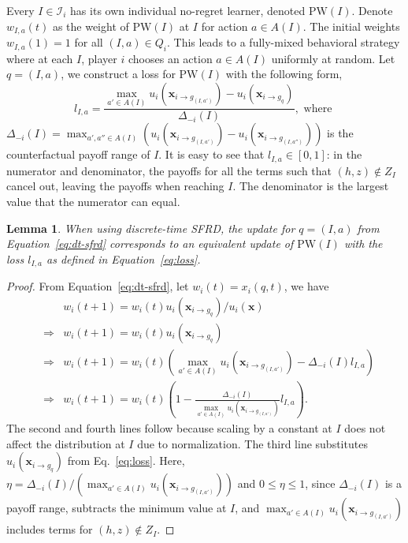 \documentclass{aamas2014}
\newcommand{\bx}{\mathbf{x}}
\newcommand{\cI}{\mathcal{I}}
\newcommand{\PW}{\mbox{PW}}
\newtheorem{lemma}{Lemma}
\begin{document}
Every $I \in \cI_i$ has its own individual no-regret learner, denoted $\PW(I)$. 
Denote $w_{I,a}(t)$ as the weight of $\PW(I)$ at $I$ for action $a \in A(I)$. 
The initial weights $w_{I,a}(1) = 1$ for all $(I,a) \in Q_i$. 
This leads to a fully-mixed behavioral strategy where at each $I$, player $i$ chooses an action 
$a \in A(I)$ uniformly at random.
Let $q = (I,a)$, we construct a loss for $\PW(I)$ with the following form,
\begin{equation}
\label{eq:loss}
l_{I,a} = \frac{\max_{a' \in A(I)} u_i(\bx_{i \rightarrow g_{(I,a')}}) - u_i(\bx_{i \rightarrow g_q})}{\Delta_{-i}(I)}, \mbox{ where }
\end{equation}
$\Delta_{-i}(I) =  \max_{a', a'' \in A(I)} ( u_i(\bx_{i \rightarrow g_{(I,a')}}) - u_i(\bx_{i \rightarrow g_{(I,a'')}}) )$ 
is the counterfactual payoff range of $I$. 
It is easy to see that $l_{I,a} \in [0,1]$: in the numerator and denominator, the payoffs for all the terms such that $(h,z) \not\in Z_I$ 
cancel out, leaving the payoffs when reaching $I$. The denominator is the largest value that the numerator can equal. 


\begin{lemma}
When using discrete-time SFRD, the update for $q = (I,a)$ from Equation~\ref{eq:dt-sfrd} corresponds to an equivalent update 
of $\PW(I)$ with the loss $l_{I,a}$ as defined in Equation~\ref{eq:loss}.
\end{lemma}
\begin{proof}
From Equation~\ref{eq:dt-sfrd}, let $w_i(t) = x_i(q,t)$, we have
\begin{eqnarray*}
  &             & w_i(t+1) = w_i(t) u_i(\bx_{i \rightarrow g_q}) / u_i(\bx) \\
  & \Rightarrow & w_i(t+1) = w_i(t) u_i(\bx_{i \rightarrow g_q}) \\
  & \Rightarrow & w_i(t+1) = w_i(t) (\max_{a' \in A(I)} u_i(\bx_{i \rightarrow g_{(I,a')}}) - \Delta_{-i}(I) l_{I,a}) \\   
  & \Rightarrow & w_i(t+1) = w_i(t) (1 - \frac{\Delta_{-i}(I)}{\max_{a' \in A(I)} u_i(\bx_{i \rightarrow g_{(I,a')}})} l_{I,a}).
\end{eqnarray*}
The second and fourth lines follow because scaling by a constant at $I$ does not affect the distribution at $I$ due to normalization.
The third line substitutes $u_i(\bx_{i \rightarrow g_q})$ from Eq.~\ref{eq:loss}. 
Here, $\eta = \Delta_{-i}(I) / ({\max_{a' \in A(I)} u_i(\bx_{i \rightarrow g_{(I,a')}})})$ and $0 \le \eta \le 1$, since $\Delta_{-i}(I)$
is a payoff range, subtracts the minimum value at $I$, 
and ${\max_{a' \in A(I)} u_i(\bx_{i \rightarrow g_{(I,a')}})}$ includes terms for $(h,z) \not\in Z_I$.
\end{proof}
\end{document}

